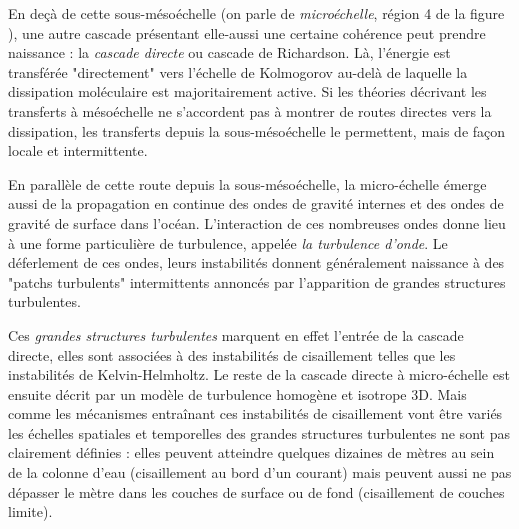 En deçà de cette sous-mésoéchelle (on parle de \textit{microéchelle}, région 4 de la figure ), une autre cascade présentant elle-aussi une certaine cohérence peut prendre naissance : la \textit{cascade directe} ou cascade de Richardson. Là, l'énergie est transférée "directement" vers l'échelle de Kolmogorov au-delà de laquelle la dissipation moléculaire est majoritairement active. Si les théories décrivant les transferts à mésoéchelle ne s'accordent pas à montrer de routes directes vers la dissipation, les transferts depuis la sous-mésoéchelle le permettent, mais de façon locale et intermittente.

En parallèle de cette route depuis la sous-mésoéchelle, la micro-échelle émerge aussi de la propagation en continue des ondes de gravité internes et des ondes de gravité de surface dans l'océan. L'interaction de ces nombreuses ondes donne lieu à une forme particulière de turbulence, appelée \textit{la turbulence d'onde}. Le déferlement de ces ondes, leurs instabilités donnent généralement naissance à des "patchs turbulents" intermittents annoncés par l'apparition de grandes structures turbulentes.


Ces \textit{grandes structures turbulentes} marquent en effet l'entrée de la cascade directe, elles sont associées à des instabilités de cisaillement telles que les instabilités de Kelvin-Helmholtz. Le reste de la cascade directe à micro-échelle est ensuite décrit par un modèle de turbulence homogène et isotrope 3D. Mais comme les mécanismes entraînant ces instabilités de cisaillement vont être variés les échelles spatiales et temporelles des grandes structures turbulentes ne sont pas clairement définies : elles peuvent atteindre quelques dizaines de mètres au sein de la colonne d'eau (cisaillement au bord d'un courant) mais peuvent aussi ne pas dépasser le mètre dans les couches de surface ou de fond (cisaillement de couches limite).

